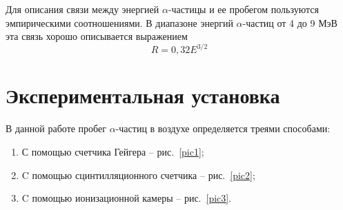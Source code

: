\documentclass[a4paper,12pt]{article} %
\begin{document}
	Для описания связи между энергией $\alpha$-частицы и ее пробегом пользуются эмпирическими соотношениями. В диапазоне энергий $\alpha$-частиц от 4 до 9 МэВ эта связь хорошо описывается выражением
	\begin{equation*}
		\label{eq:R(E)}
		\tag{$\star$}
		R = 0,32E^{3/2}
	\end{equation*}
	

\section{Экспериментальная установка}
	В данной работе пробег $\alpha$-частиц в воздухе определяется треями способами:
	\begin{enumerate}
		\item
			С помощью счетчика Гейгера -- рис.~\ref{pic1};
		\item
			C помощью сцинтилляционного счетчика -- рис.~\ref{pic2};
		\item
			C помощью ионизационной камеры -- рис.~\ref{pic3}.
	\end{enumerate} 
	
\end{document}
